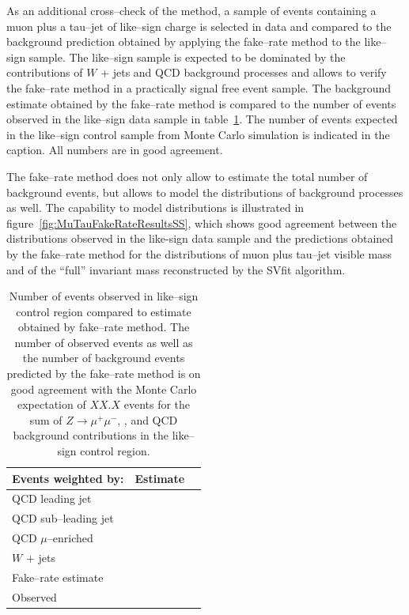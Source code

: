 As an additional cross--check of the method, a sample of events containing a
muon plus a tau--jet of like--sign charge is selected in data and compared to
the background prediction obtained by applying the fake--rate method to the
like--sign sample.  The like--sign sample is expected to be dominated by the
contributions of $W$ + jets and QCD background processes and allows to verify
the fake--rate method in a practically signal free event sample.  The background
estimate obtained by the fake--rate method is compared to the number of events
observed in the like--sign data sample in
table~\ref{tab:MuTauFakeRateResultsSS}.  The number of events expected in the
like--sign control sample from Monte Carlo simulation is indicated in the
caption.  All numbers are in good agreement.

The fake--rate method does not only allow to estimate the total number of
background events, but allows to model the distributions of background processes
as well.  The capability to model distributions is illustrated in
figure~\ref{fig:MuTauFakeRateResultsSS}, which shows good agreement between the
distributions observed in the like-sign data sample and the predictions obtained
by the fake--rate method for the distributions of muon plus tau--jet visible
mass and of the ``full'' invariant mass reconstructed by the SVfit algorithm.

\begin{table}[t]
\begin{center}
\tablesize
\begin{tabular}{|l|c|c|}
\hline
Events weighted by:     & Estimate \\
\hline
QCD leading jet           & \\
QCD sub--leading jet          & \\
QCD $\mu$--enriched     & \\
$W$ + jets              & \\
\hline
Fake--rate estimate     & \\
\hline
Observed                & \\
\hline
\end{tabular}
\end{center}
\begin{center}
\caption[Yields in like--sign control region]{Number of events observed in
like--sign control region compared to estimate obtained by fake--rate method.
The number of observed events as well as the number of background events
predicted by the fake--rate method is on good agreement with the Monte Carlo
expectation of $XX.X$ events for the sum of $Z \to \mu^{+} \mu^{-}$, \WpJets,
\ttbarpJets and QCD background contributions in the like--sign control region.}
\label{tab:MuTauFakeRateResultsSS}
\end{center}
\end{table}

